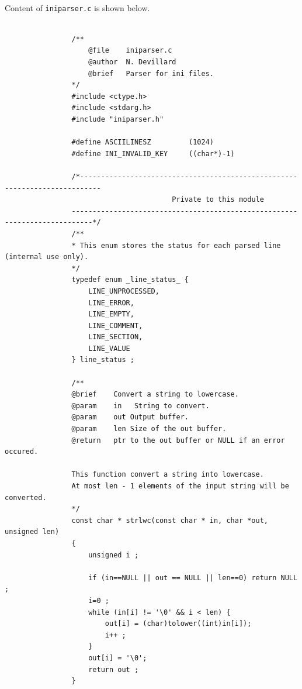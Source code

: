 \documentclass{article}
\begin{document}
            \paragraph{}
                Content of \texttt{iniparser.c} is shown below.
            \begin{Verbatim}[gobble=8]

                /**
                    @file    iniparser.c
                    @author  N. Devillard
                    @brief   Parser for ini files.
                */
                #include <ctype.h>
                #include <stdarg.h>
                #include "iniparser.h"
                
                #define ASCIILINESZ         (1024)
                #define INI_INVALID_KEY     ((char*)-1)
                
                /*---------------------------------------------------------------------------
                                        Private to this module
                ---------------------------------------------------------------------------*/
                /**
                * This enum stores the status for each parsed line (internal use only).
                */
                typedef enum _line_status_ {
                    LINE_UNPROCESSED,
                    LINE_ERROR,
                    LINE_EMPTY,
                    LINE_COMMENT,
                    LINE_SECTION,
                    LINE_VALUE
                } line_status ;
                
                /**
                @brief    Convert a string to lowercase.
                @param    in   String to convert.
                @param    out Output buffer.
                @param    len Size of the out buffer.
                @return   ptr to the out buffer or NULL if an error occured.
                
                This function convert a string into lowercase.
                At most len - 1 elements of the input string will be converted.
                */
                const char * strlwc(const char * in, char *out, unsigned len)
                {
                    unsigned i ;
                
                    if (in==NULL || out == NULL || len==0) return NULL ;
                    i=0 ;
                    while (in[i] != '\0' && i < len) {
                        out[i] = (char)tolower((int)in[i]);
                        i++ ;
                    }
                    out[i] = '\0';
                    return out ;
                }
                

\end{Verbatim}
\end{document}
